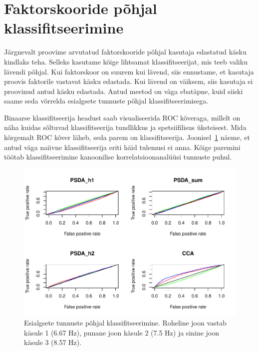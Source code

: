 \documentclass[a4paper,12pt]{report}
\begin{document}
\section{Faktorskooride põhjal klassifitseerimine}

Järgnevalt proovime arvutatud faktorskooride põhjal kasutaja edastatud käsku kindlaks teha. Selleks kasutame kõige lihtsamat klassifitseerijat, mis teeb valiku lävendi põhjal. Kui faktorskoor on suurem kui lävend, siis ennustame, et kasutaja proovis faktorile vastavat käsku edastada. Kui lävend on väiksem, siis kasutaja ei proovinud antud käsku edastada. Antud meetod on väga ebatäpne, kuid siiski saame seda võrrelda esialgsete tunnuste põhjal klassifitseerimisega. 

Binaarse klassifitseerija headust saab visualiseerida ROC kõveraga, millelt on näha kuidas sõltuvad klassifitseerija tundlikkus ja spetsiifilisus üksteisest. Mida kõrgemalt ROC kõver läheb, seda parem on klassifitseerija. Joonisel~\ref{roc} näeme, et antud väga naiivne klassifitseerija eriti häid tulemusi ei anna. Kõige paremini töötab klassifitseerimine kanoonilise korrelatsioonanalüüsi tunnuste puhul. 

\begin{figure}[h!]
	\centering\includegraphics{roc.pdf}
	\caption{Esialgsete tunnuste põhjal klassifitseerimine. Roheline joon vastab käsule 1 (6.67 Hz), punane joon käsule 2 (7.5 Hz) ja sinine joon käsule 3 (8.57 Hz).}\label{roc}
\end{figure}
\end{document}
